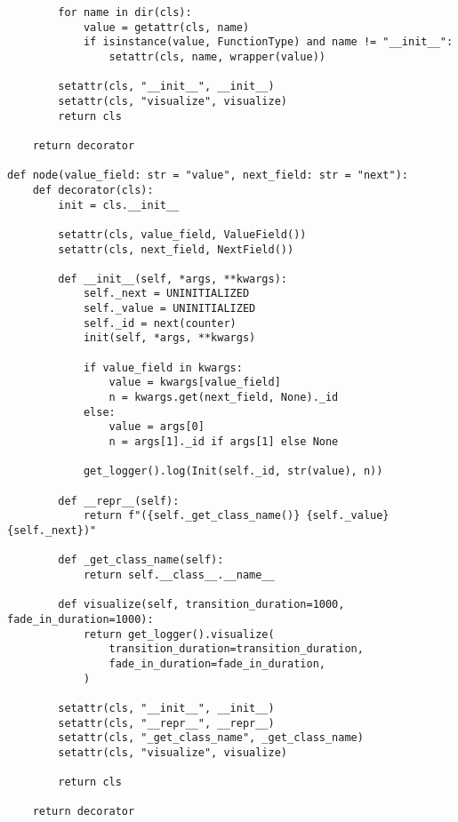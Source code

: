 \begin{verbatim}
        for name in dir(cls):
            value = getattr(cls, name)
            if isinstance(value, FunctionType) and name != "__init__":
                setattr(cls, name, wrapper(value))

        setattr(cls, "__init__", __init__)
        setattr(cls, "visualize", visualize)
        return cls

    return decorator

def node(value_field: str = "value", next_field: str = "next"):
    def decorator(cls):
        init = cls.__init__

        setattr(cls, value_field, ValueField())
        setattr(cls, next_field, NextField())

        def __init__(self, *args, **kwargs):
            self._next = UNINITIALIZED
            self._value = UNINITIALIZED
            self._id = next(counter)
            init(self, *args, **kwargs)

            if value_field in kwargs:
                value = kwargs[value_field]
                n = kwargs.get(next_field, None)._id
            else:
                value = args[0]
                n = args[1]._id if args[1] else None

            get_logger().log(Init(self._id, str(value), n))

        def __repr__(self):
            return f"({self._get_class_name()} {self._value} {self._next})"

        def _get_class_name(self):
            return self.__class__.__name__

        def visualize(self, transition_duration=1000, fade_in_duration=1000):
            return get_logger().visualize(
                transition_duration=transition_duration,
                fade_in_duration=fade_in_duration,
            )

        setattr(cls, "__init__", __init__)
        setattr(cls, "__repr__", __repr__)
        setattr(cls, "_get_class_name", _get_class_name)
        setattr(cls, "visualize", visualize)

        return cls

    return decorator
\end{verbatim}

